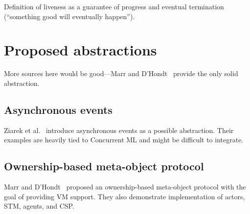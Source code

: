 \documentclass{sig-alternate}
\begin{document}
Definition of liveness as a guarantee of progress and eventual termination (``something good will eventually happen'').

\section{Proposed abstractions}

More sources here would be good---Marr and D'Hondt~\cite{Marr2012} provide the only solid abstraction.

\subsection{Asynchronous events}

Ziarek et al.~\cite{Ziarek2011} introduce asynchronous events as a possible abstraction. Their examples are heavily tied to Concurrent ML and might be difficult to integrate.

\subsection{Ownership-based meta-object protocol}

Marr and D'Hondt~\cite{Marr2012} proposed an ownership-based meta-object protocol with the goal of providing VM support. They also demonstrate implementation of actors, STM, agents, and CSP.

\printbibliography{}
\end{document}
